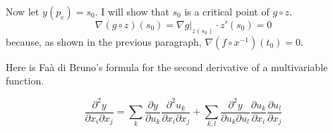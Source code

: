 \documentclass[12pt]{article}
\begin{document}
Now let $y(p_{e})=s_{0}$. I will show that $s_{0}$ is a critical point
of $g\circ{}z$.
\begin{equation}
  \label{eq:aighoowu}
  \nabla(g\circ{}z)(s_{0})=\left.\nabla{}g\right\vert_{z(s_{0})}\cdot{}z'(s_{0})=0
\end{equation}
because, as shown in the previous paragraph,
$\nabla(f\circ{}x^{-1})(t_{0})=0$.

Here is Fa{\`a} di Bruno's formula for the second derivative of a
multivariable function.

\begin{equation}
  \label{eq:phetuvao}
  \frac{\partial^{2}y}{\partial{}x_{i}\partial{}x_{j}}=\sum_{k}\frac{\partial{}y}{\partial{}u_{k}}\frac{\partial^{2}u_{k}}{\partial{}x_{i}\partial{}x_{j}}+\sum_{k,l}\frac{\partial^{2}y}{\partial{}u_{k}\partial{}u_{l}}\frac{\partial{}u_{k}}{\partial{}x_{i}}\frac{\partial{}u_{l}}{\partial{}x_{j}}
\end{equation}


 

\end{document}
